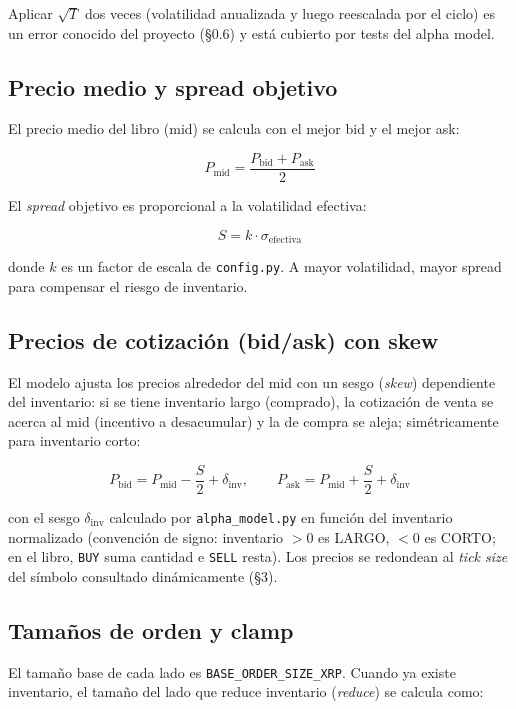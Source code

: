 \documentclass[11pt,a4paper]{article}
\newcommand{\codigo}[1]{\texttt{#1}}
\begin{document}
Aplicar $\sqrt{T}$ dos veces (volatilidad anualizada y luego reescalada
por el ciclo) es un error conocido del proyecto (§0.6) y está cubierto
por tests del alpha model.

\subsection{Precio medio y spread objetivo}
El precio medio del libro (mid) se calcula con el mejor bid y el mejor
ask:

\begin{equation}
  P_{\mathrm{mid}} = \frac{P_{\mathrm{bid}} + P_{\mathrm{ask}}}{2}
\end{equation}

El \emph{spread} objetivo es proporcional a la volatilidad efectiva:

\begin{equation}
  S = k\cdot\sigma_{\mathrm{efectiva}}
\end{equation}

donde $k$ es un factor de escala de \codigo{config.py}. A mayor
volatilidad, mayor spread para compensar el riesgo de inventario.

\subsection{Precios de cotización (bid/ask) con skew}
El modelo ajusta los precios alrededor del mid con un sesgo
(\emph{skew}) dependiente del inventario: si se tiene inventario largo
(comprado), la cotización de venta se acerca al mid (incentivo a
desacumular) y la de compra se aleja; simétricamente para inventario
corto:

\begin{equation}
  P_{\mathrm{bid}} = P_{\mathrm{mid}} - \frac{S}{2} + \delta_{\mathrm{inv}},
  \qquad
  P_{\mathrm{ask}} = P_{\mathrm{mid}} + \frac{S}{2} + \delta_{\mathrm{inv}}
\end{equation}

con el sesgo $\delta_{\mathrm{inv}}$ calculado por
\codigo{alpha\_model.py} en función del inventario normalizado
(convención de signo: inventario $> 0$ es LARGO, $< 0$ es CORTO; en el
libro, \codigo{BUY} suma cantidad e \codigo{SELL} resta). Los precios se
redondean al \emph{tick size} del símbolo consultado dinámicamente (§3).

\subsection{Tamaños de orden y clamp}
El tamaño base de cada lado es \codigo{BASE\_ORDER\_SIZE\_XRP}. Cuando
ya existe inventario, el tamaño del lado que reduce inventario
(\emph{reduce}) se calcula como:
\end{document}
